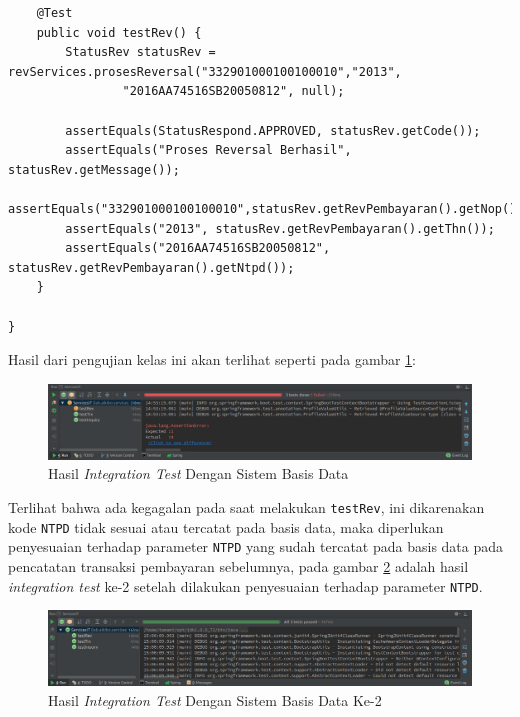 \documentclass[pdftex,12pt, oneside]{article}
\begin{document}
\begin{enumerate}[A.]
\begin{enumerate}[1.]
\begin{lstlisting}
    @Test
    public void testRev() {
        StatusRev statusRev = revServices.prosesReversal("332901000100100010","2013",
                "2016AA74516SB20050812", null);

        assertEquals(StatusRespond.APPROVED, statusRev.getCode());
        assertEquals("Proses Reversal Berhasil", statusRev.getMessage());
        assertEquals("332901000100100010",statusRev.getRevPembayaran().getNop());
        assertEquals("2013", statusRev.getRevPembayaran().getThn());
        assertEquals("2016AA74516SB20050812", statusRev.getRevPembayaran().getNtpd());
    }

}
    \end{lstlisting}
    
    Hasil dari pengujian kelas ini akan terlihat seperti pada gambar \ref{fig:services-it-fail}:
    
    \begin{figure}[H]
      \centering
      \includegraphics[width=1\textwidth]{./resources/07-services-it}
      \caption{Hasil \textit{Integration Test} Dengan Sistem Basis Data}
      \label{fig:services-it-fail}
    \end{figure}
    
    Terlihat bahwa ada kegagalan pada saat melakukan \texttt{testRev}, ini dikarenakan kode \texttt{NTPD} tidak sesuai atau tercatat pada basis data, maka diperlukan penyesuaian terhadap parameter \texttt{NTPD} yang sudah tercatat pada basis data pada pencatatan transaksi pembayaran sebelumnya, pada gambar \ref{fig:services-it-success} adalah hasil \textit{integration test} ke-2 setelah dilakukan penyesuaian terhadap parameter \texttt{NTPD}.
    
    \begin{figure}[H]
      \centering
      \includegraphics[width=1\textwidth]{./resources/08-services-it-2}
      \caption{Hasil \textit{Integration Test} Dengan Sistem Basis Data Ke-2}
      \label{fig:services-it-success}
    \end{figure}
    
  \end{enumerate}
\end{enumerate}
\end{document}
